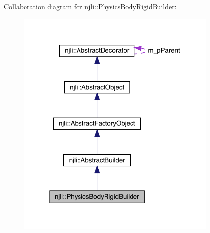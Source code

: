 Collaboration diagram for njli\+:\+:Physics\+Body\+Rigid\+Builder\+:\nopagebreak
\begin{figure}[H]
\begin{center}
\leavevmode
\includegraphics[width=279pt]{classnjli_1_1_physics_body_rigid_builder__coll__graph}
\end{center}
\end{figure}
